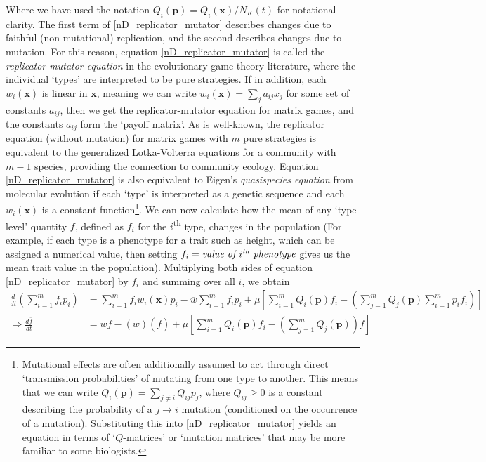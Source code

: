 Where we have used the notation $Q_i(\mathbf{p}) = Q_i(\mathbf{x})/N_K(t)$ for notational clarity. The first term of \eqref{nD_replicator_mutator} describes changes due to faithful (non-mutational) replication, and the second describes changes due to mutation. For this reason, equation \eqref{nD_replicator_mutator} is called the \emph{replicator-mutator equation} in the evolutionary game theory literature, where the individual `types' are interpreted to be pure strategies. If in addition, each $w_i(\mathbf{x})$ is linear in $\mathbf{x}$, meaning we can write $w_i(\mathbf{x}) = \sum_{j}a_{ij}x_j$ for some set of constants $a_{ij}$, then we get the replicator-mutator equation for matrix games, and the constants $a_{ij}$ form the `payoff matrix'. As is well-known, the replicator equation (without mutation) for matrix games with $m$ pure strategies is equivalent to the generalized Lotka-Volterra equations for a community with $m-1$ species\citep{hofbauer_evolutionary_1998}, providing the connection to community ecology.  Equation \eqref{nD_replicator_mutator} is also equivalent to Eigen's \emph{quasispecies equation} from molecular evolution if each `type' is interpreted as a genetic sequence and each $w_i(\mathbf{x})$ is a constant function\footnote{Mutational effects are often additionally assumed to act through direct `transmission probabilities' of mutating from one type to another. This means that we can write $Q_i(\mathbf{p}) = \sum\limits_{j\neq i}Q_{ij}p_j$, where $Q_{ij} \geq0$ is a constant describing the probability of a $j \to i$ mutation (conditioned on the occurrence of a mutation). Substituting this into \eqref{nD_replicator_mutator} yields an equation in terms of `$Q$-matrices' or `mutation matrices' that may be more familiar to some biologists.}. We can now calculate how the mean of any `type level' quantity $f$, defined as $f_i$ for the $i$\textsuperscript{th} type, changes in the population (For example, if each type is a phenotype for a trait such as height, which can be assigned a numerical value, then setting $f_i = \textit{value of $i\textsuperscript{th}$ phenotype}$ gives us the mean trait value in the population). Multiplying both sides of equation \eqref{nD_replicator_mutator} by $f_i$ and summing over all $i$, we obtain
\begin{align*}
\frac{d}{dt}\left(\sum\limits_{i=1}^{m}f_ip_i\right) &= \sum\limits_{i=1}^{m}f_iw_i(\mathbf{x})p_i - \overline{w}\sum\limits_{i=1}^{m}f_ip_i + \mu\left[\sum\limits_{i=1}^{m}Q_i(\mathbf{p})f_i - \left(\sum\limits_{j=1}^{m}Q_j(\mathbf{p})\sum\limits_{i=1}^{m}p_if_i\right)\right]\\
\Rightarrow \frac{d\overline{f}}{dt} &= \overline{wf}-(\overline{w})(\overline{f}) + \mu\left[\sum\limits_{i=1}^{m}Q_i(\mathbf{p})f_i - \left(\sum\limits_{j=1}^{m}Q_j(\mathbf{p})\right)\overline{f}\right]
\end{align*}

